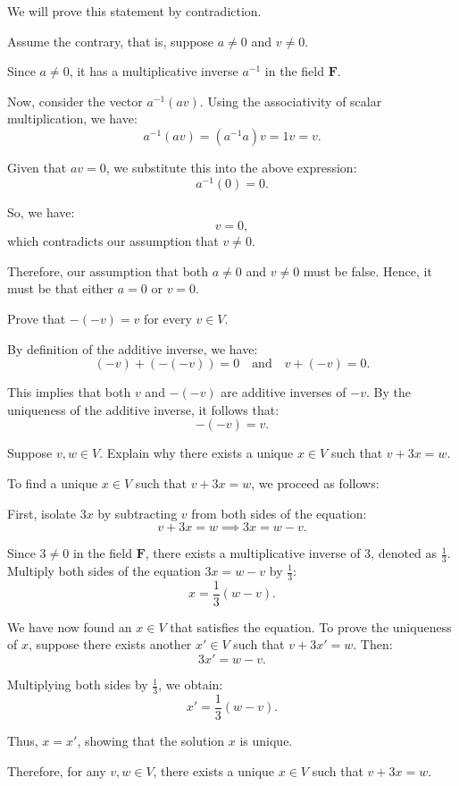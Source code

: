 \begin{solution}
We will prove this statement by contradiction.

Assume the contrary, that is, suppose $a \neq 0$ and $v \neq 0$. 

Since $a \neq 0$, it has a multiplicative inverse $a^{-1}$ in the field $\mathbf{F}$. 

Now, consider the vector $a^{-1}(av)$. Using the associativity of scalar multiplication, we have:
\[
a^{-1}(av) = (a^{-1}a)v = 1v = v.
\]

Given that $av = 0$, we substitute this into the above expression:
\[
a^{-1}(0) = 0.
\]

So, we have:
\[
v = 0,
\]
which contradicts our assumption that $v \neq 0$.

Therefore, our assumption that both $a \neq 0$ and $v \neq 0$ must be false. Hence, it must be that either $a = 0$ or $v = 0$.
\end{solution}

\begin{exercise}
Prove that $-(-v) = v$ for every $v \in V$.
\end{exercise}

\begin{solution}
By definition of the additive inverse, we have:
\[
(-v) + (-(-v)) = 0 \quad \text{and} \quad v + (-v) = 0.
\]

This implies that both $v$ and $-(-v)$ are additive inverses of $-v$. By the uniqueness of the additive inverse, it follows that:
\[
-(-v) = v.
\]
\end{solution}

\begin{exercise}
Suppose $v, w \in V$. Explain why there exists a unique $x \in V$ such that $v + 3x = w$.
\end{exercise}

\begin{solution}
To find a unique $x \in V$ such that $v + 3x = w$, we proceed as follows:

First, isolate $3x$ by subtracting $v$ from both sides of the equation:
\[
v + 3x = w \implies 3x = w - v.
\]

Since $3 \neq 0$ in the field $\mathbf{F}$, there exists a multiplicative inverse of $3$, denoted as $\frac{1}{3}$. Multiply both sides of the equation $3x = w - v$ by $\frac{1}{3}$:
\[
x = \frac{1}{3} (w - v).
\]

We have now found an $x \in V$ that satisfies the equation. To prove the uniqueness of $x$, suppose there exists another $x' \in V$ such that $v + 3x' = w$. Then:
\[
3x' = w - v.
\]

Multiplying both sides by $\frac{1}{3}$, we obtain:
\[
x' = \frac{1}{3} (w - v).
\]

Thus, $x = x'$, showing that the solution $x$ is unique.

Therefore, for any $v, w \in V$, there exists a unique $x \in V$ such that $v + 3x = w$.
\end{solution}


